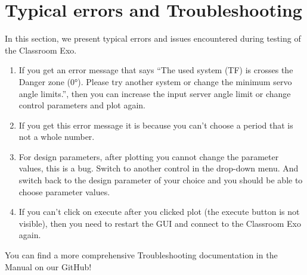 \section{Typical errors and Troubleshooting}
In this section, we present typical errors and issues encountered during testing of the Classroom Exo. 
\begin{enumerate}
	\item If you get an error message that says “The used system (TF) is crosses the Danger zone (0°). Please try another system or change the minimum servo angle limits.”, then you can  increase the input server angle limit or change control parameters and plot again. 
	\item If you get this error message it is because you can't choose a period that is not a whole number. 
	\item For design parameters, after plotting you cannot change the parameter values, this is a bug. Switch to another control in the drop-down menu. And switch back to the design parameter of your choice and you should be able to choose parameter values.
	\item If you can’t click on execute after you clicked plot (the execute button is not visible), then you need to restart the GUI and connect to the Classroom Exo again.
\end{enumerate}

\begin{tcolorbox}[colback=green!5!white,colframe=green!75!black,title=Hint]
	You can find a more comprehensive Troubleshooting documentation in the Manual on our GitHub!
\end{tcolorbox}
\vspace{0.5cm}


	




